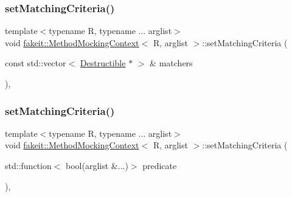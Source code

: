 \mbox{\label{classfakeit_1_1MethodMockingContext_affc5ac50fc419a5f8b5adff8d5d02941}} 
\subsubsection{\texorpdfstring{setMatchingCriteria()}{setMatchingCriteria()}\hspace{0.1cm}{\footnotesize\ttfamily [5/27]}}
{\footnotesize\ttfamily template$<$typename R, typename ... arglist$>$ \\
void \mbox{\hyperlink{classfakeit_1_1MethodMockingContext}{fakeit\+::\+Method\+Mocking\+Context}}$<$ R, arglist $>$\+::set\+Matching\+Criteria (\begin{DoxyParamCaption}\item[{const std\+::vector$<$ \mbox{\hyperlink{classfakeit_1_1Destructible}{Destructible}} $\ast$ $>$ \&}]{matchers }\end{DoxyParamCaption})\hspace{0.3cm}{\ttfamily [inline]}, {\ttfamily [protected]}}

\mbox{\label{classfakeit_1_1MethodMockingContext_a43555a14b32453588eb3990a7c6b9a09}} 
\subsubsection{\texorpdfstring{setMatchingCriteria()}{setMatchingCriteria()}\hspace{0.1cm}{\footnotesize\ttfamily [6/27]}}
{\footnotesize\ttfamily template$<$typename R, typename ... arglist$>$ \\
void \mbox{\hyperlink{classfakeit_1_1MethodMockingContext}{fakeit\+::\+Method\+Mocking\+Context}}$<$ R, arglist $>$\+::set\+Matching\+Criteria (\begin{DoxyParamCaption}\item[{std\+::function$<$ bool(arglist \&...)$>$}]{predicate }\end{DoxyParamCaption})\hspace{0.3cm}{\ttfamily [inline]}, {\ttfamily [protected]}}

